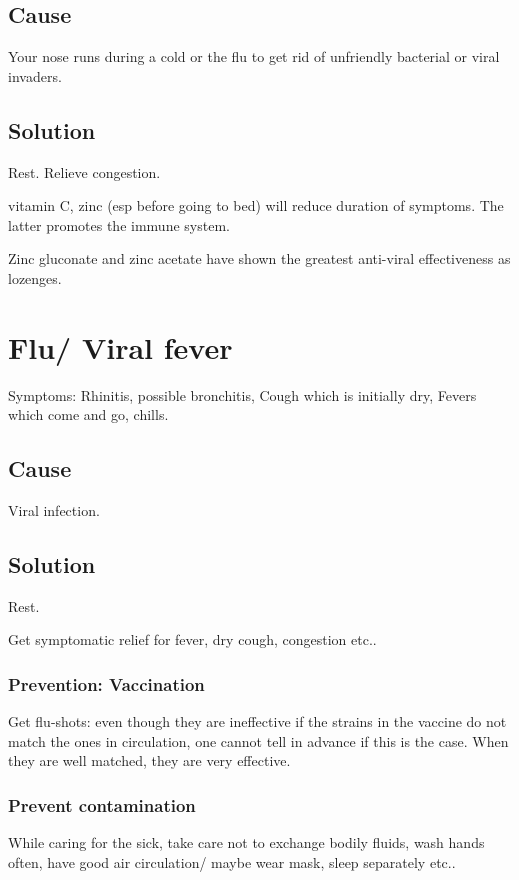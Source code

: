 \documentclass[oneside, article]{memoir}
\begin{document}
\subsection{Cause}
Your nose runs during a cold or the flu to get rid of unfriendly bacterial or viral invaders.

\subsection{Solution}
Rest. Relieve congestion.

vitamin C, zinc (esp before going to bed) will reduce duration of symptoms. The latter promotes the immune system.

Zinc gluconate and zinc acetate have shown the greatest anti-viral effectiveness as lozenges.

\section{Flu/ Viral fever}
Symptoms: Rhinitis, possible bronchitis, Cough which is initially dry, Fevers which come and go, chills.

\subsection{Cause}
Viral infection.

\subsection{Solution}
Rest.

Get symptomatic relief for fever, dry cough, congestion etc..

\subsubsection{Prevention: Vaccination}
Get flu-shots: even though they are ineffective if the strains in the vaccine do not match the ones in circulation, one cannot tell in advance if this is the case. When they are well matched, they are very effective.

\subsubsection{Prevent contamination}
While caring for the sick, take care not to exchange bodily fluids, wash hands often, have good air circulation/ maybe wear mask, sleep separately etc..
\end{document}
